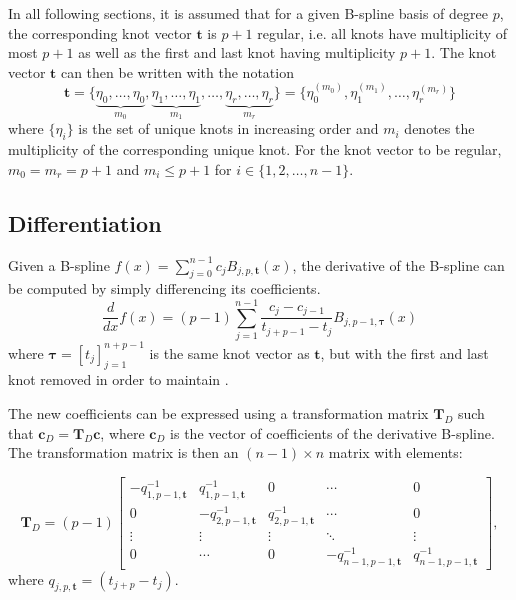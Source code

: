 In all following sections, it is assumed that for a given B-spline basis of degree $p$, the corresponding knot vector $\mathbf t$ is $p+1$ regular, i.e. all knots have multiplicity of most $p+1$ as well as the first and last knot having multiplicity $p+1$. The knot vector $\mathbf t$ can then be written with the notation 
\begin{equation}\label{eq:regular-knot-vector}
    \mathbf t = \{\underbrace{\eta_0, \dots, \eta_0}_{m_0}, \underbrace{\eta_1, \dots, \eta_1}_{m_1}, \dots, \underbrace{\eta_{r}, \dots, \eta_{r}}_{m_r}\} = \{\eta_0^{(m_0)}, \eta_1^{(m_1)}, \dots, \eta_r^{(m_r)}\}
\end{equation}
where $\{\eta_i\}$ is the set of unique knots in increasing order and $m_i$ denotes the multiplicity of the corresponding unique knot. For the knot vector to be regular, $m_0 = m_r = p+1$ and $m_i \leq p+1$ for $i \in \{1,2,\ldots,n-1\}$.

\subsection{Differentiation}\label{sec:derivative}
Given a B-spline $f(x) = \sum_{j=0}^{n-1} c_j B_{j, p, \mathbf{t}}(x)$,
the derivative of the B-spline can be computed by simply differencing its coefficients. 
\begin{equation}\label{eq:b-spline-derivative}
    \frac{d}{dx} f(x) = (p-1) \sum_{j=1}^{n-1} \frac{c_j-c_{j-1}}{t_{j+p-1}-t_j} B_{j, p-1, \boldsymbol{\tau}}(x)
\end{equation}
where $\boldsymbol{\tau} = [t_j]_{j=1}^{n+p-1}$ is the same knot vector as $\mathbf{t}$, but with the first and last knot removed in order to maintain .

The new coefficients can be expressed using a transformation matrix $\mathbf T_D$ such that $\mathbf{c}_D = \mathbf T_D \mathbf{c}$, where $\mathbf{c}_D$ is the vector of coefficients of the derivative B-spline. The transformation matrix is then an $(n-1) \times n$ matrix with elements:

\begin{equation}
    \mathbf T_D = (p-1) \begin{bmatrix}
        -q_{1,p-1,\mathbf{t}}^{-1} & q_{1,p-1,\mathbf{t}}^{-1} & 0 & \cdots & 0 \\
        0 & -q_{2,p-1,\mathbf{t}}^{-1} & q_{2,p-1,\mathbf{t}}^{-1} & \cdots & 0 \\
        \vdots & \vdots & \vdots & \ddots & \vdots \\
        0 & \cdots & 0 & -q_{n-1,p-1,\mathbf{t}}^{-1} & q_{n-1,p-1,\mathbf{t}}^{-1} 
    \end{bmatrix},
\end{equation}
where $q_{j,p,\mathbf{t}} = (t_{j+p}-t_j)$.


